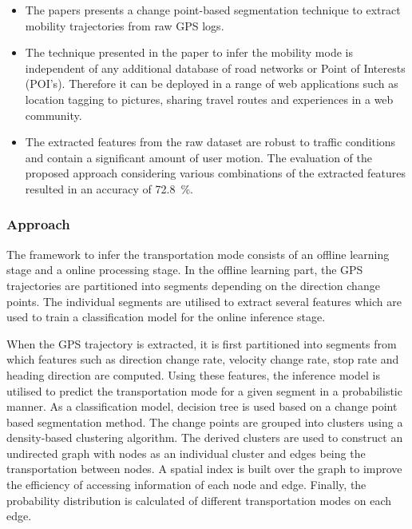 \begin{itemize}
	\item The papers presents a change point-based segmentation technique to extract mobility 
	trajectories from raw GPS logs. 
	
	\item The technique presented in the paper to infer the mobility mode is independent 
	of any additional database of road networks or Point of Interests (POI's). Therefore it can 
	be deployed in a range of web applications such as location tagging to pictures, sharing travel routes
	and experiences in a web community. 
	
	\item The extracted features from the raw dataset are robust to traffic conditions and contain
	a significant amount of user motion. The evaluation of the proposed approach considering various
	combinations of the extracted features resulted in an accuracy of 72.8~\%. 
	
\end{itemize}


\subsubsection*{Approach}

The framework to infer the transportation mode consists of an offline learning stage and a online
processing stage. In the offline learning part, the GPS trajectories are partitioned into segments
depending on the direction change points. The individual segments are utilised to extract
several features which are used to train a classification model for the online inference stage.\newline

When the GPS trajectory is extracted, it is first partitioned into segments from which features such as
direction change rate, velocity change rate, stop rate and heading direction are computed.
Using these features, the inference model is utilised to predict the transportation mode for
a given segment in a probabilistic manner. As a classification model, decision tree is used based on
a change point based segmentation method. The change points are grouped into clusters using
a density-based clustering algorithm. The derived clusters are used to construct an undirected graph
with nodes as an individual cluster and edges being the transportation between nodes. A spatial index is
built over the graph to improve the efficiency of accessing information of each node and edge. Finally,
the probability distribution is calculated of different transportation modes on each edge.

